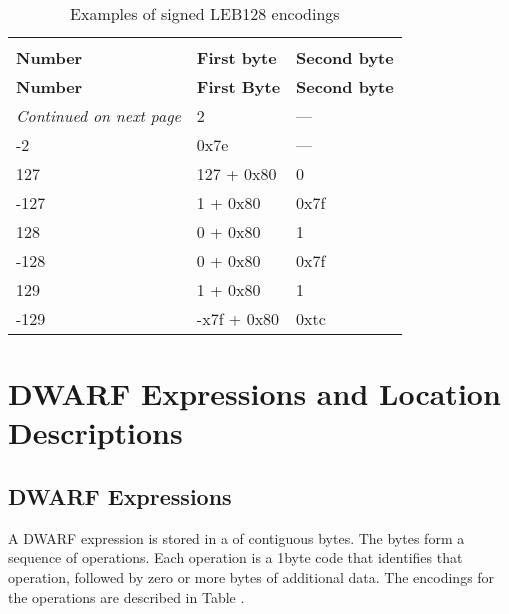 \begin{centering}
\setlength{\extrarowheight}{0.1cm}
\begin{longtable}{l|l|l}
  \caption{Examples of signed LEB128 encodings} \label{tab:examplesofsignedleb128encodings} \\
  \hline \\ \bfseries Number&\bfseries First byte &\bfseries Second byte \\ \hline
\endfirsthead
  \bfseries Number&\bfseries First Byte &\bfseries Second byte\\ \hline
\endhead
  \hline \emph{Continued on next page}
\endfoot
  \hline
\endlastfoot
2&2& --- \\
-2&0x7e& ---\\
127& 127 + 0x80 & 0 \\
-127& 1 + 0x80 & 0x7f \\
128& 0 + 0x80 & 1 \\
-128& 0 + 0x80 & 0x7f \\
129& 1 + 0x80 & 1 \\
-129& -x7f + 0x80 & 0xtc \\

\end{longtable}
\end{centering}



\section{DWARF Expressions and Location Descriptions}
\label{datarep:dwarfexpressionsandlocationdescriptions}
\subsection{DWARF Expressions}
\label{datarep:dwarfexpressions}

A 
DWARF expression is stored in a  of contiguous
bytes. The bytes form a sequence of operations. Each operation
is a 1\dash byte code that identifies that operation, followed by
zero or more bytes of additional data. The encodings for the
operations are described in 
Table . 

